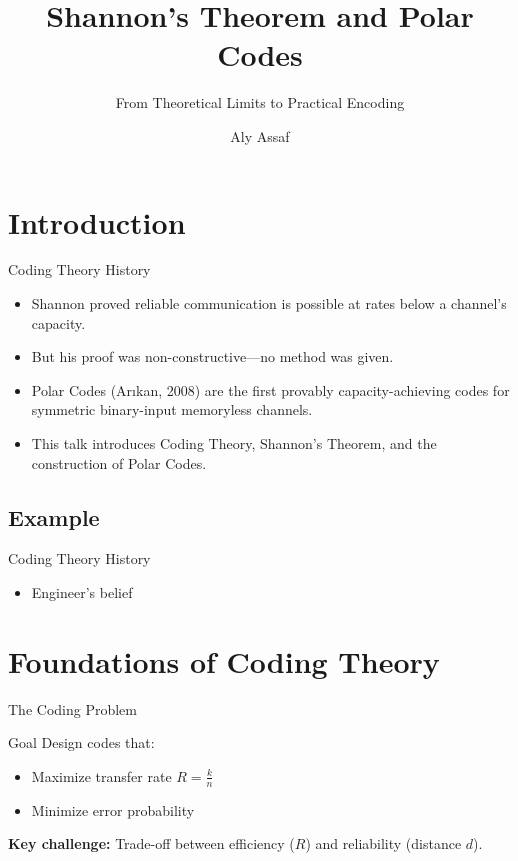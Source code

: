 \documentclass[11pt]{beamer}
\title[Polar Codes]{Shannon’s Theorem and Polar Codes}
\subtitle{From Theoretical Limits to Practical Encoding}
\author{Aly Assaf}
\institute{April 2025}
\date{}
\begin{document}
\begin{frame}
  \titlepage
\end{frame}

\section{Introduction}
\begin{frame}{Coding Theory History}
\begin{itemize}
    \item Shannon proved reliable communication is possible at rates below a channel’s capacity.
    \item But his proof was non-constructive—no method was given.
    \item Polar Codes (Arıkan, 2008) are the first provably capacity-achieving codes for symmetric binary-input memoryless channels.
    \item This talk introduces Coding Theory, Shannon’s Theorem, and the construction of Polar Codes.
\end{itemize}
\end{frame}


\subsection{Example}
\begin{frame}{Coding Theory History}
\begin{itemize}
    \item Engineer's belief
\end{itemize}
\end{frame}
\section{Foundations of Coding Theory}
\begin{frame}{The Coding Problem}
\begin{block}{Goal}
Design codes that:
\begin{itemize}
    \item Maximize transfer rate $R = \frac{k}{n}$
    \item Minimize error probability
\end{itemize}
\end{block}
\pause
\textbf{Key challenge:} Trade-off between efficiency ($R$) and reliability (distance $d$).
\end{frame}
\end{document}
